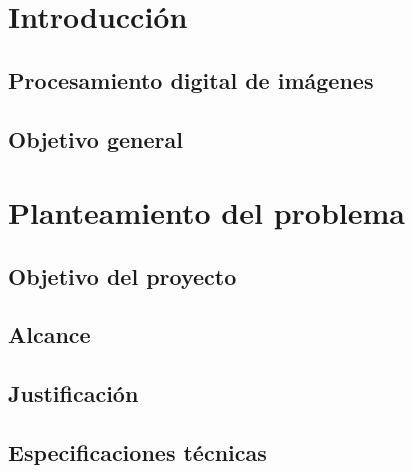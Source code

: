 \chapter{Introducción}

\section{Procesamiento digital de imágenes}
\section{Objetivo general}

\chapter{Planteamiento del problema}

\section{Objetivo del proyecto}
\section{Alcance}
\section{Justificación}
\section{Especificaciones técnicas}